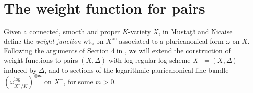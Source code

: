 \documentclass{amsart}%
\numberwithin{equation}{subsection}
\theoremstyle{plain2}
\newtheorem{prop}[equation]{Proposition}
\theoremstyle{definition2}
\theoremstyle{stepstyle}
\theoremstyle{point}
\theoremstyle{subpoint}
\newcommand{\N}{\ensuremath{\mathbb{N}}}
\newcommand{\cX}{\ensuremath{\mathscr{X}}}
\newcommand{\caC}{\ensuremath{\mathcal{C}}}
\newcommand{\cY}{\ensuremath{\mathscr{Y}}}
\newcommand{\cZ}{\ensuremath{\mathscr{Z}}}
\renewcommand{\cZ}{\ensuremath{\mathscr{Z}}}
\renewcommand{\cY}{\ensuremath{\mathscr{Y}}}
\newcommand{\an}{\mathrm{an}}
\newcommand{\weight}{\mathrm{wt}}
\newcommand{\Sk}{\mathrm{Sk}}
\begin{document}
%


\section{The weight function for pairs} \label{sect wt log}

Given a connected, smooth and proper $K$-variety $X$, in \cite{MustataNicaise} Musta\c{t}\u{a} and Nicaise define the \textit{weight function} $\weight_{\omega}$ on $X^\an$ associated to a pluricanonical form $\omega$ on $X$. Following the arguments of Section 4 in \cite{MustataNicaise}, we will extend the construction of weight functions to pairs $(X,\Delta)$ with log-regular log scheme $X^+=(X,\Delta)$ induced by $\Delta$, and to sections of the logarithmic pluricanonical line bundle $(\omega^{\log}_{X^+/K})^{\otimes m}$ on $X^+$, for some $m>0$.
\end{document}
